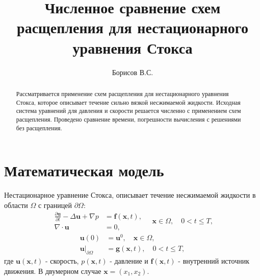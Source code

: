 \documentclass[12pt]{article}
\title{Численное сравнение схем расщепления для нестационарного уравнения Стокса}
\author{Борисов В.С.}
\begin{document}
\maketitle

\begin{abstract}
Рассматривается применение схем расщепления для нестационарного уравнения Стокса, которое описывает течение сильно вязкой несжимаемой жидкости. 
Исходная система уравнений для давления и скорости решается численно с применением схем расщепления. 
Проведено сравнение времени, погрешности вычисления с решениями без расщепления.
\end{abstract}

\section{Математическая модель}
Нестационарное уравнение Стокса, описывает течение несжимаемой жидкости в области $\Omega$ с границей $\partial \Omega$:
\begin{equation*}
\begin{aligned}
\frac{\partial {\bm u}}{\partial t} -\Delta {\bm u} + \nabla p &= {\bm f}({\bm x}, t), \\
\nabla\cdot{\bm u} &= 0, 
\end{aligned}
\quad {\bm x} \in \Omega, \quad 0<t \leq T,
\end{equation*} 
$$
\begin{aligned}
{\bm u(0)} &= {\bm u^0}, \quad {\bm x} \in \Omega, \\
{\bm u |_{\partial \Omega} } &= {\bm g}({\bm x}, t), \quad 0<t \leq T,
\end{aligned}
$$
где ${\bm u}({\bm x}, t)$ - скорость, $p({\bm x}, t)$ - давление и ${\bm f}({\bm x}, t)$ - внутренний источник движения. В двумерном случае ${\bm x}=(x_1, x_2)$.
\end{document}
